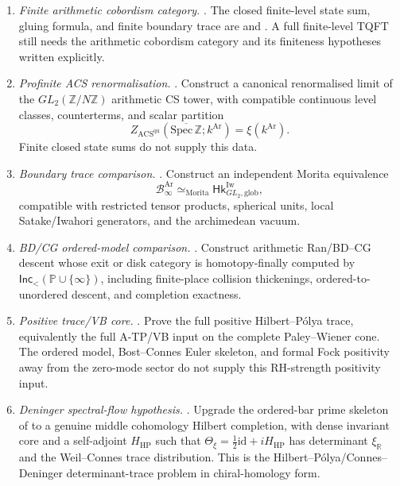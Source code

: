 \begin{enumerate}
\item \emph{Finite arithmetic cobordism category.}
\ClaimStatusConditional. The closed finite-level state sum, gluing
formula, and finite boundary trace are
 and
. A full finite-level
TQFT still needs the arithmetic cobordism category and its finiteness
hypotheses written explicitly.
\item \emph{Profinite ACS renormalisation.}
\ClaimStatusConjectured. Construct a canonical renormalised limit of
the \(GL_2(\mathbb Z/N\mathbb Z)\) arithmetic CS tower, with compatible
continuous level classes, counterterms, and scalar partition
\[
Z_{\mathrm{ACS}^{\mathrm{qu}}}(\overline{\mathrm{Spec}\,\mathbb Z};k^{\mathrm{Ar}})
=\xi(k^{\mathrm{Ar}}).
\]
Finite closed state sums do not supply this data.
\item \emph{Boundary trace comparison.}
\ClaimStatusConditional. Construct an independent Morita equivalence
\[
\mathcal B_\infty^{\mathrm{Ar}}\simeq_{\mathrm{Morita}}
\mathsf{Hk}^{\mathrm{Iw}}_{GL_2,\mathrm{glob}},
\]
compatible with restricted tensor products, spherical units, local
Satake/Iwahori generators, and the archimedean vacuum.
\item \emph{BD/CG ordered-model comparison.}
\ClaimStatusConditional. Construct arithmetic Ran/BD--CG descent whose
exit or disk category is homotopy-finally computed by
\(\mathsf{Inc}_{<}(\mathbb P\cup\{\infty\})\), including finite-place
collision thickenings, ordered-to-unordered descent, and completion
exactness.
\item \emph{Positive trace/VB core.}
\ClaimStatusConjectured. Prove the full positive Hilbert--P\'olya
trace, equivalently the full A-TP/VB input on the complete
Paley--Wiener cone. The ordered model, Bost--Connes Euler skeleton, and
formal Fock positivity away from the zero-mode sector do not supply
this RH-strength positivity input.
\item \emph{Deninger spectral-flow hypothesis.}
\ClaimStatusConjectured. Upgrade the ordered-bar prime skeleton of
 to a genuine
middle cohomology Hilbert completion, with dense invariant core and a
self-adjoint \(H_{\mathrm{HP}}\) such that
\(\Theta_\xi=\frac12\mathrm{id}+iH_{\mathrm{HP}}\) has determinant
\(\xi_{\mathbb R}\) and the Weil--Connes trace distribution. This is
the Hilbert--P\'olya/Connes--Deninger determinant-trace problem in
chiral-homology form.
\end{enumerate}

